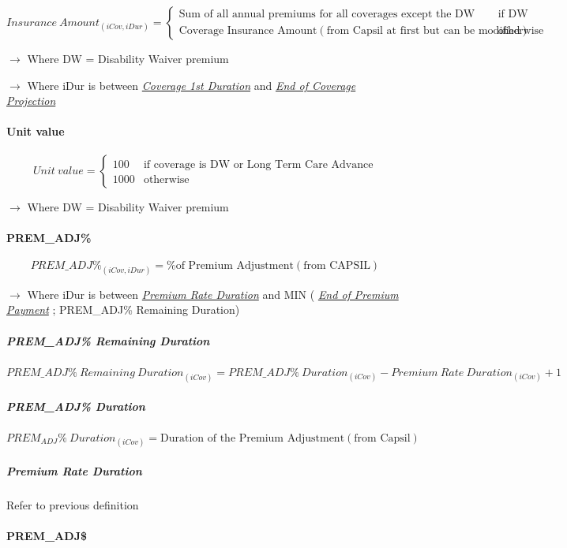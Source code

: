 \documentclass[10pt]{article}
\begin{document}
\[
{Insurance\ Amount}_{\left(iCov,iDur\right)} = \begin{cases}
\text{Sum of all annual premiums for all coverages except the DW coverages} & \text{if DW coverage} \\
\text{Coverage Insurance Amount} \left(\text{from Capsil at first but can be modified}\right) & \text{otherwise}
\end{cases}
\]

$\rightarrow$ Where DW = Disability Waiver premium

$\rightarrow$ Where iDur is between \underline{\textit{Coverage 1st Duration}} and \underline{\textit{End of Coverage Projection}}

\paragraph{Unit value}

\[
Unit\ value = \begin{cases}
100 & \text{if coverage is DW or Long Term Care Advance} \\
1000 & \text{otherwise}
\end{cases}
\]

$\rightarrow$ Where DW = Disability Waiver premium

\paragraph{PREM\_ADJ\%}

\[
{PREM\_ADJ\%}_{\left(iCov,iDur\right)} = \text{\% of Premium Adjustment} \left(\text{from CAPSIL}\right)
\]

$\rightarrow$ Where iDur is between \underline{\textit{Premium Rate Duration}} and MIN ( \underline{\textit{End of Premium Payment}} ; PREM\_ADJ\% Remaining Duration)

\subparagraph{PREM\_ADJ\% Remaining Duration}

\[
{PREM\_ADJ\%\ Remaining\ Duration}_{\left(iCov\right)} = {PREM\_ADJ\%\ Duration}_{\left(iCov\right)} - {Premium\ Rate\ Duration}_{\left(iCov\right)} + 1
\]

\subparagraph{PREM\_ADJ\% Duration}

\[
PREM_{ADJ}\%\ {Duration}_{\left(iCov\right)} = \text{Duration of the Premium Adjustment} \left(\text{from Capsil}\right)
\]

\subparagraph{Premium Rate Duration}
Refer to previous definition

\paragraph{PREM\_ADJ\$}
\end{document}
